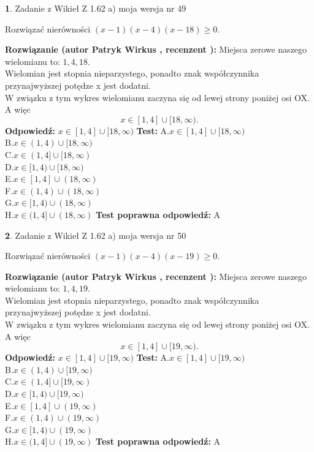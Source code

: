 \documentclass[12pt, a4paper]{article}
\theoremstyle{definition} %
\newtheorem{zad}{}
\newcommand{\zadStart}[1]{\begin{zad}#1\newline}
\newcommand{\zadStop}{\end{zad}}
\newcommand{\rozwStart}[2]{\noindent \textbf{Rozwiązanie (autor #1 , recenzent #2): }\newline}
\newcommand{\rozwStop}{\newline}
\newcommand{\odpStart}{\noindent \textbf{Odpowiedź:}\newline}
\newcommand{\odpStop}{\newline}
\newcommand{\testStart}{\noindent \textbf{Test:}\newline}
\newcommand{\testStop}{\newline}
\newcommand{\kluczStart}{\noindent \textbf{Test poprawna odpowiedź:}\newline}
\newcommand{\kluczStop}{\newline}
\begin{document}
\zadStart{Zadanie z Wikieł Z 1.62 a) moja wersja nr 49}

Rozwiązać nierówności $(x-1)(x-4)(x-18)\ge0$.
\zadStop
\rozwStart{Patryk Wirkus}{}
Miejsca zerowe naszego wielomianu to: $1, 4, 18$.\\
Wielomian jest stopnia nieparzystego, ponadto znak współczynnika przy\linebreak najwyższej potędze x jest dodatni.\\ W związku z tym wykres wielomianu zaczyna się od lewej strony poniżej osi OX. A więc $$x \in [1,4] \cup [18,\infty).$$
\rozwStop
\odpStart
$x \in [1,4] \cup [18,\infty)$
\odpStop
\testStart
A.$x \in [1,4] \cup [18,\infty)$\\
B.$x \in (1,4) \cup [18,\infty)$\\
C.$x \in (1,4] \cup [18,\infty)$\\
D.$x \in [1,4) \cup [18,\infty)$\\
E.$x \in [1,4] \cup (18,\infty)$\\
F.$x \in (1,4) \cup (18,\infty)$\\
G.$x \in [1,4) \cup (18,\infty)$\\
H.$x \in (1,4] \cup (18,\infty)$
\testStop
\kluczStart
A
\kluczStop



\zadStart{Zadanie z Wikieł Z 1.62 a) moja wersja nr 50}

Rozwiązać nierówności $(x-1)(x-4)(x-19)\ge0$.
\zadStop
\rozwStart{Patryk Wirkus}{}
Miejsca zerowe naszego wielomianu to: $1, 4, 19$.\\
Wielomian jest stopnia nieparzystego, ponadto znak współczynnika przy\linebreak najwyższej potędze x jest dodatni.\\ W związku z tym wykres wielomianu zaczyna się od lewej strony poniżej osi OX. A więc $$x \in [1,4] \cup [19,\infty).$$
\rozwStop
\odpStart
$x \in [1,4] \cup [19,\infty)$
\odpStop
\testStart
A.$x \in [1,4] \cup [19,\infty)$\\
B.$x \in (1,4) \cup [19,\infty)$\\
C.$x \in (1,4] \cup [19,\infty)$\\
D.$x \in [1,4) \cup [19,\infty)$\\
E.$x \in [1,4] \cup (19,\infty)$\\
F.$x \in (1,4) \cup (19,\infty)$\\
G.$x \in [1,4) \cup (19,\infty)$\\
H.$x \in (1,4] \cup (19,\infty)$
\testStop
\kluczStart
A
\kluczStop
\end{document}

